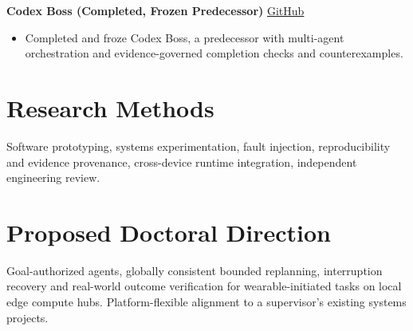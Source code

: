 \documentclass[10pt,a4paper]{article}
\begin{document}
\textbf{Codex Boss (Completed, Frozen Predecessor)} \hfill \href{https://github.com/zhiheng-zhang-Mera/Codex-Boss}{GitHub}\\
\begin{itemize}
\item Completed and froze Codex Boss, a predecessor with multi-agent orchestration and evidence-governed completion checks and counterexamples.
\end{itemize}

\section{Research Methods}
Software prototyping, systems experimentation, fault injection, reproducibility and evidence provenance, cross-device runtime integration, independent engineering review.

\section{Proposed Doctoral Direction}
Goal-authorized agents, globally consistent bounded replanning, interruption recovery and real-world outcome verification for wearable-initiated tasks on local edge compute hubs. Platform-flexible alignment to a supervisor's existing systems projects.

\par\smallskip{}
\end{document}
